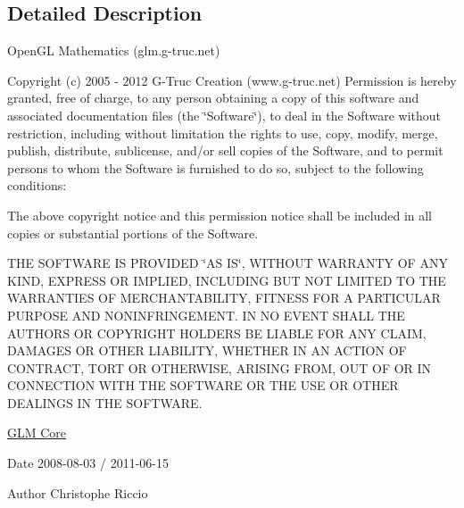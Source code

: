 \subsection{\-Detailed \-Description}
\-Open\-G\-L \-Mathematics (glm.\-g-\/truc.\-net)

\-Copyright (c) 2005 -\/ 2012 \-G-\/\-Truc \-Creation (www.\-g-\/truc.\-net) \-Permission is hereby granted, free of charge, to any person obtaining a copy of this software and associated documentation files (the \char`\"{}\-Software\char`\"{}), to deal in the \-Software without restriction, including without limitation the rights to use, copy, modify, merge, publish, distribute, sublicense, and/or sell copies of the \-Software, and to permit persons to whom the \-Software is furnished to do so, subject to the following conditions\-:

\-The above copyright notice and this permission notice shall be included in all copies or substantial portions of the \-Software.

\-T\-H\-E \-S\-O\-F\-T\-W\-A\-R\-E \-I\-S \-P\-R\-O\-V\-I\-D\-E\-D \char`\"{}\-A\-S I\-S\char`\"{}, \-W\-I\-T\-H\-O\-U\-T \-W\-A\-R\-R\-A\-N\-T\-Y \-O\-F \-A\-N\-Y \-K\-I\-N\-D, \-E\-X\-P\-R\-E\-S\-S \-O\-R \-I\-M\-P\-L\-I\-E\-D, \-I\-N\-C\-L\-U\-D\-I\-N\-G \-B\-U\-T \-N\-O\-T \-L\-I\-M\-I\-T\-E\-D \-T\-O \-T\-H\-E \-W\-A\-R\-R\-A\-N\-T\-I\-E\-S \-O\-F \-M\-E\-R\-C\-H\-A\-N\-T\-A\-B\-I\-L\-I\-T\-Y, \-F\-I\-T\-N\-E\-S\-S \-F\-O\-R \-A \-P\-A\-R\-T\-I\-C\-U\-L\-A\-R \-P\-U\-R\-P\-O\-S\-E \-A\-N\-D \-N\-O\-N\-I\-N\-F\-R\-I\-N\-G\-E\-M\-E\-N\-T. \-I\-N \-N\-O \-E\-V\-E\-N\-T \-S\-H\-A\-L\-L \-T\-H\-E \-A\-U\-T\-H\-O\-R\-S \-O\-R \-C\-O\-P\-Y\-R\-I\-G\-H\-T \-H\-O\-L\-D\-E\-R\-S \-B\-E \-L\-I\-A\-B\-L\-E \-F\-O\-R \-A\-N\-Y \-C\-L\-A\-I\-M, \-D\-A\-M\-A\-G\-E\-S \-O\-R \-O\-T\-H\-E\-R \-L\-I\-A\-B\-I\-L\-I\-T\-Y, \-W\-H\-E\-T\-H\-E\-R \-I\-N \-A\-N \-A\-C\-T\-I\-O\-N \-O\-F \-C\-O\-N\-T\-R\-A\-C\-T, \-T\-O\-R\-T \-O\-R \-O\-T\-H\-E\-R\-W\-I\-S\-E, \-A\-R\-I\-S\-I\-N\-G \-F\-R\-O\-M, \-O\-U\-T \-O\-F \-O\-R \-I\-N \-C\-O\-N\-N\-E\-C\-T\-I\-O\-N \-W\-I\-T\-H \-T\-H\-E \-S\-O\-F\-T\-W\-A\-R\-E \-O\-R \-T\-H\-E \-U\-S\-E \-O\-R \-O\-T\-H\-E\-R \-D\-E\-A\-L\-I\-N\-G\-S \-I\-N \-T\-H\-E \-S\-O\-F\-T\-W\-A\-R\-E.

\hyperlink{group__core}{\-G\-L\-M \-Core}

\begin{DoxyDate}{\-Date}
2008-\/08-\/03 / 2011-\/06-\/15 
\end{DoxyDate}
\begin{DoxyAuthor}{\-Author}
\-Christophe \-Riccio 
\end{DoxyAuthor}
